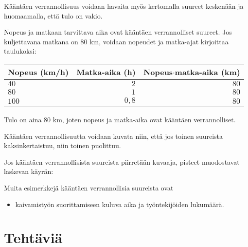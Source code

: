 
Kääntäen verrannollisuus voidaan havaita myös kertomalla suureet
keskenään ja huomaamalla, että tulo on vakio.

\begin{esimerkki}
Nopeus ja matkaan tarvittava aika ovat kääntäen verrannolliset suureet.
Jos kuljettavana matkana on $80$ km, voidaan nopeudet ja matka-ajat
kirjoittaa taulukoksi:
\begin{center} 
\begin{tabular}{|l|r|r|}
\hline
Nopeus (km/h) & Matka-aika (h) & Nopeus$\cdot$matka-aika (km) \\
\hline
$40$ & $2$ & $80$ \\
$80$ & $1$ & $80$ \\
$100$ & $0,8$ & $80$ \\
\hline
\end{tabular}
\end{center}
Tulo on aina $80$ km, joten nopeus ja matka-aika ovat kääntäen verrannolliset.
\end{esimerkki}

Kääntäen verrannollisuutta voidaan kuvata niin, että jos
toinen suureista kaksinkertaistuu, niin toinen puolittuu.

Jos kääntäen verrannollisista suureista piirretään kuvaaja, pisteet
muodostavat laskevan käyrän:


Muita esimerkkejä kääntäen verrannollisia suureista ovat
\begin{itemize}
    \item kaivamistyön suorittamiseen kuluva aika ja työntekijöiden lukumäärä.
\end{itemize}

\section*{Tehtäviä}

